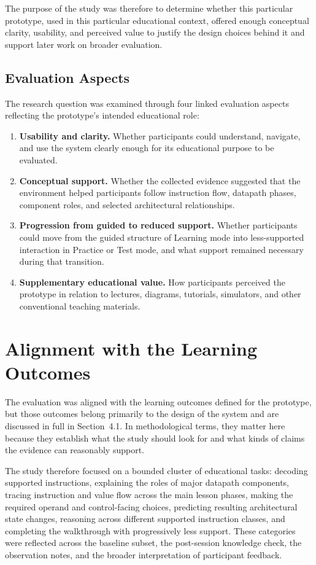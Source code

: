 The purpose of the study was therefore to determine whether this particular prototype, used in this particular educational context, offered enough conceptual clarity, usability, and perceived value to justify the design choices behind it and support later work on broader evaluation.

\subsection{Evaluation Aspects}

The research question was examined through four linked evaluation aspects reflecting the prototype's intended educational role:

\begin{enumerate}
\item \textbf{Usability and clarity.} Whether participants could understand, navigate, and use the system clearly enough for its educational purpose to be evaluated.
\item \textbf{Conceptual support.} Whether the collected evidence suggested that the environment helped participants follow instruction flow, datapath phases, component roles, and selected architectural relationships.
\item \textbf{Progression from guided to reduced support.} Whether participants could move from the guided structure of Learning mode into less-supported interaction in Practice or Test mode, and what support remained necessary during that transition.
\item \textbf{Supplementary educational value.} How participants perceived the prototype in relation to lectures, diagrams, tutorials, simulators, and other conventional teaching materials.
\end{enumerate}

\section{Alignment with the Learning Outcomes}

The evaluation was aligned with the learning outcomes defined for the prototype, but those outcomes belong primarily to the design of the system and are discussed in full in Section~4.1. In methodological terms, they matter here because they establish what the study should look for and what kinds of claims the evidence can reasonably support.

The study therefore focused on a bounded cluster of educational tasks: decoding supported instructions, explaining the roles of major datapath components, tracing instruction and value flow across the main lesson phases, making the required operand and control-facing choices, predicting resulting architectural state changes, reasoning across different supported instruction classes, and completing the walkthrough with progressively less support. These categories were reflected across the baseline subset, the post-session knowledge check, the observation notes, and the broader interpretation of participant feedback.

